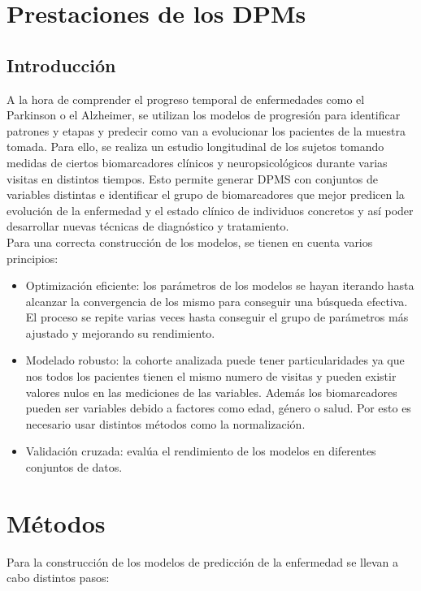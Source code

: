 \documentclass[12pt]{article}
\begin{document}
\section{Prestaciones de los DPMs}
\subsection{Introducción}

A la hora de comprender el progreso temporal de enfermedades como el Parkinson o el Alzheimer, se utilizan los modelos de progresión para identificar patrones y etapas y predecir como van a evolucionar los pacientes de la muestra tomada. Para ello, se realiza un estudio longitudinal de los sujetos tomando medidas de ciertos biomarcadores clínicos y neuropsicológicos durante varias visitas en distintos tiempos. Esto permite generar DPMS con conjuntos de variables distintas e identificar el grupo de biomarcadores que mejor predicen la evolución de la enfermedad y el estado clínico de individuos concretos y así poder desarrollar nuevas técnicas de diagnóstico y tratamiento. \\

Para una correcta construcción de los modelos, se tienen en cuenta varios principios:
\begin{itemize}
	\item Optimización eficiente: los parámetros de los modelos se hayan iterando hasta alcanzar la convergencia de los mismo para conseguir una búsqueda efectiva. El proceso se repite varias veces hasta conseguir el grupo de parámetros más ajustado y mejorando su rendimiento.
	\item Modelado robusto: la cohorte analizada puede tener particularidades ya que nos todos los pacientes tienen el mismo numero de visitas y pueden existir valores nulos en las mediciones de las variables. Además los biomarcadores pueden ser variables debido a factores como edad, género o salud. Por esto es necesario usar distintos métodos como la normalización.
	\item Validación cruzada: evalúa el rendimiento de los modelos en diferentes conjuntos de datos.
\end{itemize} 

\section{Métodos}
Para la construcción de los modelos de predicción de la enfermedad se llevan a cabo distintos pasos:
\end{document}

